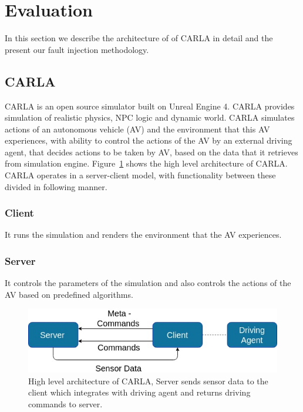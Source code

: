 \section{Evaluation} 
In this section we describe the architecture of of CARLA in detail and the present our fault injection methodology. 

\subsection{CARLA} \label{ri-carla}
CARLA is an open source simulator built on Unreal Engine 4. CARLA provides simulation of realistic physics, NPC logic and dynamic world. CARLA simulates actions of an autonomous vehicle (AV) and the environment that this AV experiences, with ability to control the actions of the AV by an external driving agent,  that decides actions to be taken by AV, based on the data that it retrieves from simulation engine. Figure~\ref{fig:carla_arch} shows the high level architecture of CARLA. CARLA operates in a server-client model, with functionality between these divided in following manner.

\subsubsection{Client} It runs the simulation and renders the environment that the AV experiences.

\subsubsection{Server} It controls the parameters of the simulation and also controls the actions of the AV based on predefined algorithms. 

\begin{figure}  [h]
	\vspace{-0.5em}
	\centering
	\includegraphics[scale=0.4]{CARLA_block}
	\vspace{-0.5em}
	\caption{High level architecture of CARLA, Server sends sensor data to the client which integrates with driving agent and returns driving commands to server.}
	\label{fig:carla_arch}
	\vspace{-1.5em}
\end{figure}

